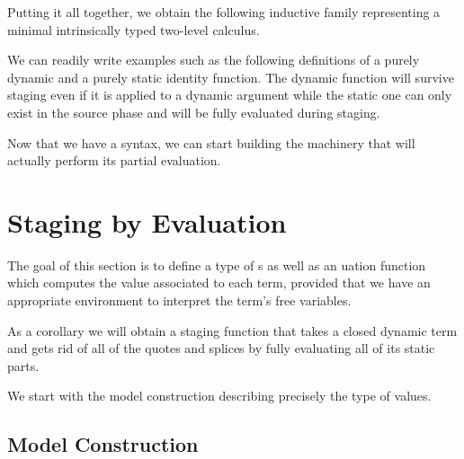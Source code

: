 \documentclass{article}
\begin{document}
Putting it all together, we obtain the following inductive
family representing a minimal intrinsically typed two-level
calculus.

\begin{AgdaAlign}
  \begin{AgdaSuppressSpace}
  \end{AgdaSuppressSpace}
\end{AgdaAlign}

We can readily write examples such as the following definitions
of a purely dynamic and a purely static identity function. The
dynamic function will survive staging even if it is applied to a
dynamic argument while the static one can only exist in the
source phase and will be fully evaluated during staging.

\noindent
\begin{minipage}{.4\textwidth}
\end{minipage}\hfill
\begin{minipage}{.5\textwidth}
\end{minipage}

Now that we have a syntax, we can start building the machinery
that will actually perform its partial evaluation.

\section{Staging by Evaluation}

The goal of this section is to define a type of s
as well as an uation function which computes the
value associated to each term, provided that we have an
appropriate environment to interpret the term's free variables.


As a corollary we will obtain a staging function
that takes a closed dynamic term and gets rid of all of
the quotes and splices by fully
evaluating all of its static parts.


We start with the model construction describing precisely
the type of values.

\subsection{Model Construction}\label{sec:stagingmodel}
\end{document}
